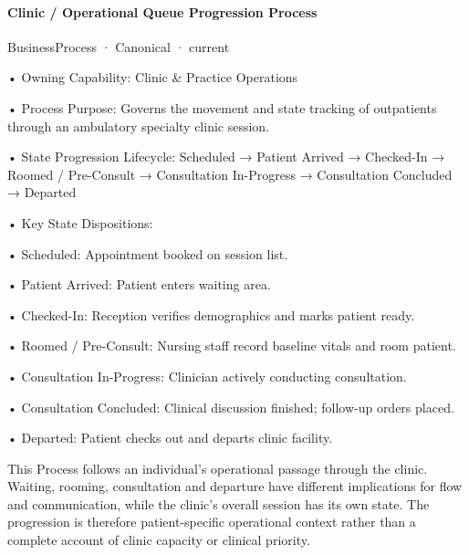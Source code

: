 \paragraph{Clinic / Operational Queue Progression Process}

\label{element:319d6956276a4cdeb43e350e1b01d078}
{\small BusinessProcess · Canonical · current}\par

•
Owning Capability: Clinic \& Practice Operations



•
Process Purpose: Governs the movement and state tracking of outpatients through an ambulatory specialty clinic session.



•
State Progression Lifecycle: Scheduled → Patient Arrived → Checked-In → Roomed / Pre-Consult → Consultation In-Progress → Consultation Concluded → Departed



•
Key State Dispositions:



•
Scheduled: Appointment booked on session list.



•
Patient Arrived: Patient enters waiting area.



•
Checked-In: Reception verifies demographics and marks patient ready.



•
Roomed / Pre-Consult: Nursing staff record baseline vitals and room patient.



•
Consultation In-Progress: Clinician actively conducting consultation.



•
Consultation Concluded: Clinical discussion finished; follow-up orders placed.



•
Departed: Patient checks out and departs clinic facility.



This Process follows an individual's operational passage through the clinic. Waiting, rooming, consultation and departure have different implications for flow and communication, while the clinic's overall session has its own state. The progression is therefore patient-specific operational context rather than a complete account of clinic capacity or clinical priority.


